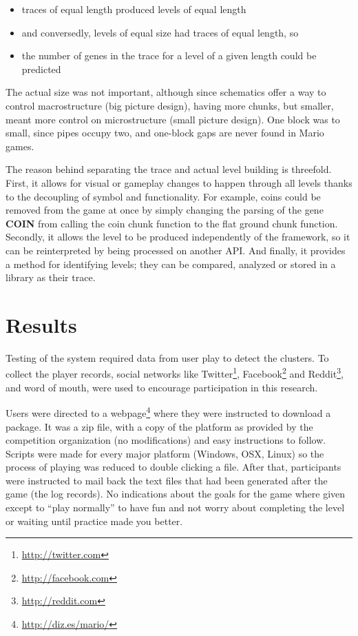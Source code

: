 \documentclass[conference]{IEEEtran}
\begin{document}
\begin{itemize}

	\item traces of equal length produced levels of equal length

	\item and conversedly, levels of equal size had traces of equal length, so

	\item the number of genes in the trace for a level of a given length could be predicted

\end{itemize}

The actual size was not important, although since schematics offer a way to control macrostructure (big picture design), having more chunks, but smaller, meant more control on microstructure (small picture design). One block was to small, since pipes occupy two, and one-block gaps are never found in Mario games.

The reason behind separating the trace and actual level building is threefold. First, it allows for visual or gameplay changes to happen through all levels thanks to the decoupling of symbol and functionality. For example, coins could be removed from the game at once by simply changing the parsing of the gene \textbf{COIN} from calling the coin chunk function to the flat ground chunk function. Secondly, it allows the level to be produced independently of the framework, so it can be reinterpreted by being processed on another API. And finally, it provides a method for identifying levels; they can be compared, analyzed or stored in a library as their trace.


\section{Results}

Testing of the system required data from user play to detect the clusters. To collect the player records, social networks like Twitter\footnote{\url{http://twitter.com}}, Facebook\footnote{\url{http://facebook.com}} and Reddit\footnote{\url{http://reddit.com}}, and word of mouth, were used to encourage participation in this research.

Users were directed to a webpage\footnote{\url{http://diz.es/mario/}} where they were instructed to download a package. It was a zip file, with a copy of the platform as provided by the competition organization (no modifications) and easy instructions to follow. Scripts were made for every major platform (Windows, OSX, Linux) so the process of playing was reduced to double clicking a file. After that, participants were instructed to mail back the text files that had been generated after the game (the log records). No indications about the goals for the game where given except to ``play normally'' to have fun and not worry about completing the level or waiting until practice made you better.
\end{document}

